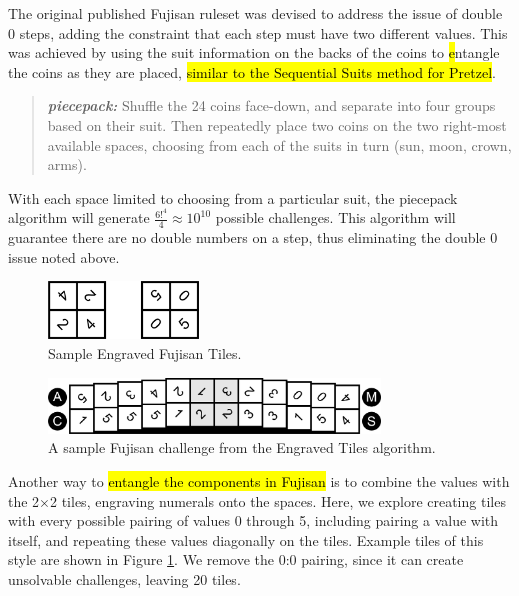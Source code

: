 \documentclass[journal]{IEEEtran}
\begin{document}
The original published Fujisan ruleset was devised to address the issue of double 0 steps, adding the constraint that each step must have two different values. This was achieved by using the suit information on the backs of the coins to {\hl entangle} the coins as they are placed, \hl{similar to the Sequential Suits method for Pretzel}.

\begin{quote}
    
  {\it \bf piecepack:} Shuffle the 24 coins face-down, and separate into four groups based on their suit. Then repeatedly place two coins on the two right-most available spaces, choosing from each of the suits in turn (sun, moon, crown, arms).
\end{quote}

With each space limited to choosing from a particular suit, the piecepack algorithm will generate $\frac{6!^4}{4} \approx 10^{10}$ possible challenges. 
This algorithm will guarantee there are no double numbers on a step, thus eliminating the double 0 issue noted above. 

\begin{figure}[t]
\centering
\includegraphics[width=4cm]{engravedsample.png}
\caption{Sample Engraved Fujisan Tiles.}
\label{fig:engravedsample}
\end{figure}


\begin{figure}[b]
\includegraphics[width=8.8cm]{fujisan-engraved.png}
\caption{A sample Fujisan challenge from the Engraved Tiles algorithm.}
\label{fig:tileexample}
\end{figure}



Another way to \hl{entangle the components in Fujisan} is to combine the values with the 2$\times$2 tiles, engraving numerals onto the spaces. Here, we explore creating tiles with every possible pairing of values 0 through 5, including pairing a value with itself, and repeating these values diagonally on the tiles. Example tiles of this style are shown in Figure \ref{fig:engravedsample}. We remove the 0:0 pairing, since it can create unsolvable challenges, leaving 20 tiles.
\end{document}
